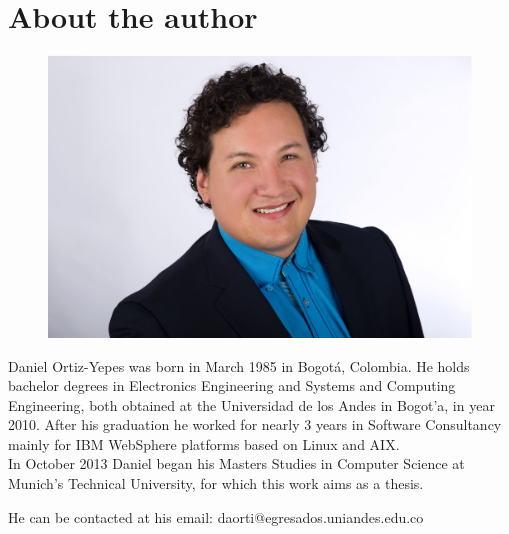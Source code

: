 \chapter{About the author}
\thispagestyle{empty}


\begin{figure}[ht]
\hspace{75mm}
		\includegraphics[width=.4\textwidth]{figures/dortiz-portrait.eps}
		\label{fig:me}
\end{figure}

\vspace{15mm}

Daniel Ortiz-Yepes was born in March 1985 in Bogot\'a, Colombia. He holds bachelor degrees in Electronics Engineering and Systems and Computing Engineering, both obtained at the Universidad de los Andes in Bogot'a,  in year 2010. After his graduation he worked for nearly 3 years in Software Consultancy mainly for IBM WebSphere platforms based on Linux and AIX.
\\
 In October 2013 Daniel began his Masters Studies in Computer Science at Munich's Technical University, for which this work aims as a thesis. 

\vspace{20mm}
\begin{flushright}
He can be contacted at his email: daorti@egresados.uniandes.edu.co
\end{flushright}


\vspace{1cm}
